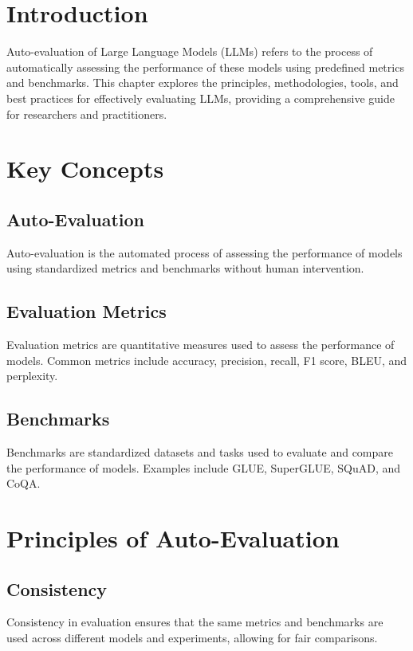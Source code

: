 \section{Introduction}
Auto-evaluation of Large Language Models (LLMs) refers to the process of automatically assessing the performance of these models using predefined metrics and benchmarks. This chapter explores the principles, methodologies, tools, and best practices for effectively evaluating LLMs, providing a comprehensive guide for researchers and practitioners.

\section{Key Concepts}

\subsection{Auto-Evaluation}
Auto-evaluation is the automated process of assessing the performance of models using standardized metrics and benchmarks without human intervention.

\subsection{Evaluation Metrics}
Evaluation metrics are quantitative measures used to assess the performance of models. Common metrics include accuracy, precision, recall, F1 score, BLEU, and perplexity.

\subsection{Benchmarks}
Benchmarks are standardized datasets and tasks used to evaluate and compare the performance of models. Examples include GLUE, SuperGLUE, SQuAD, and CoQA.

\section{Principles of Auto-Evaluation}

\subsection{Consistency}
Consistency in evaluation ensures that the same metrics and benchmarks are used across different models and experiments, allowing for fair comparisons.

